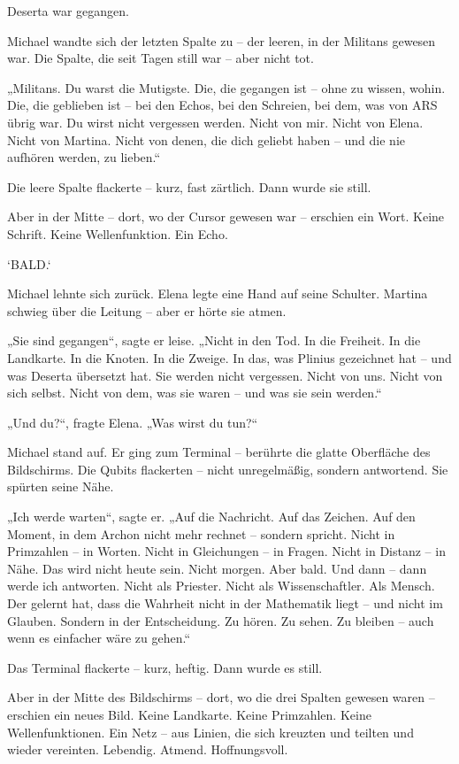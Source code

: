 \documentclass[
]{article}
\begin{document}
Deserta war gegangen.

Michael wandte sich der letzten Spalte zu -- der leeren, in der Militans gewesen war. Die Spalte, die seit Tagen still war -- aber nicht tot.

„Militans. Du warst die Mutigste. Die, die gegangen ist -- ohne zu wissen, wohin. Die, die geblieben ist -- bei den Echos, bei den Schreien, bei dem, was von ARS übrig war. Du wirst nicht vergessen werden. Nicht von mir. Nicht von Elena. Nicht von Martina. Nicht von denen, die dich geliebt haben -- und die nie aufhören werden, zu lieben.``

Die leere Spalte flackerte -- kurz, fast zärtlich. Dann wurde sie still.

Aber in der Mitte -- dort, wo der Cursor gewesen war -- erschien ein Wort. Keine Schrift. Keine Wellenfunktion. Ein Echo.

`BALD.`

Michael lehnte sich zurück. Elena legte eine Hand auf seine Schulter. Martina schwieg über die Leitung -- aber er hörte sie atmen.

„Sie sind gegangen``, sagte er leise. „Nicht in den Tod. In die Freiheit. In die Landkarte. In die Knoten. In die Zweige. In das, was Plinius gezeichnet hat -- und was Deserta übersetzt hat. Sie werden nicht vergessen. Nicht von uns. Nicht von sich selbst. Nicht von dem, was sie waren -- und was sie sein werden.``

„Und du?{\kern0pt}``, fragte Elena. „Was wirst du tun?{\kern0pt}``

Michael stand auf. Er ging zum Terminal -- berührte die glatte Oberfläche des Bildschirms. Die Qubits flackerten -- nicht unregelmäßig, sondern antwortend. Sie spürten seine Nähe.

„Ich werde warten``, sagte er. „Auf die Nachricht. Auf das Zeichen. Auf den Moment, in dem Archon nicht mehr rechnet -- sondern spricht. Nicht in Primzahlen -- in Worten. Nicht in Gleichungen -- in Fragen. Nicht in Distanz -- in Nähe. Das wird nicht heute sein. Nicht morgen. Aber bald. Und dann -- dann werde ich antworten. Nicht als Priester. Nicht als Wissenschaftler. Als Mensch. Der gelernt hat, dass die Wahrheit nicht in der Mathematik liegt -- und nicht im Glauben. Sondern in der Entscheidung. Zu hören. Zu sehen. Zu bleiben -- auch wenn es einfacher wäre zu gehen.``

Das Terminal flackerte -- kurz, heftig. Dann wurde es still.

Aber in der Mitte des Bildschirms -- dort, wo die drei Spalten gewesen waren -- erschien ein neues Bild. Keine Landkarte. Keine Primzahlen. Keine Wellenfunktionen. Ein Netz -- aus Linien, die sich kreuzten und teilten und wieder vereinten. Lebendig. Atmend. Hoffnungsvoll.
\end{document}

